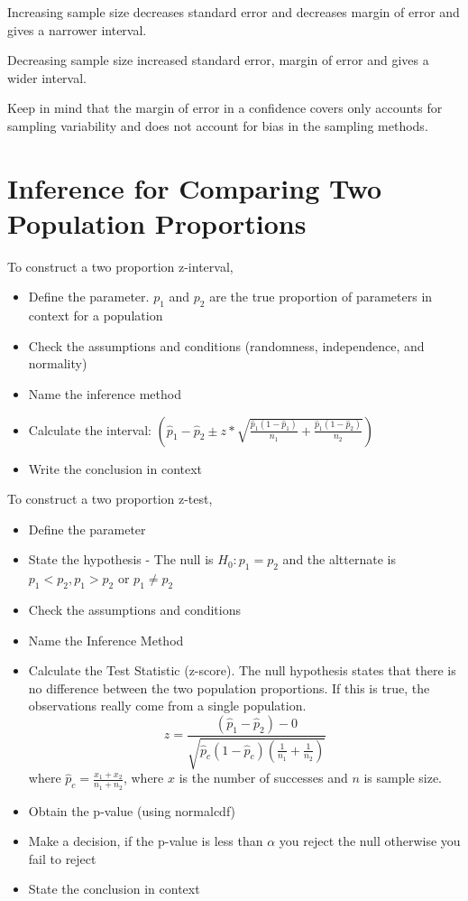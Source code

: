 \documentclass[../stats.tex]{subfiles}
\begin{document}
Increasing sample size decreases standard error and decreases margin of error and gives a narrower interval.

Decreasing sample size increased standard error, margin of error and gives a wider interval.

Keep in mind that the margin of error in a confidence covers only accounts for sampling variability and does not account for bias in the sampling methods.
\section{Inference for Comparing Two Population Proportions}
To construct a two proportion z-interval,
\begin{itemize}
    \item Define the parameter. $p_1$ and $p_2$ are the true proportion of parameters in context for a population 
    \item Check the assumptions and conditions (randomness, independence, and normality)
    \item Name the inference method
    \item Calculate the interval: $(\hat{p}_1-\hat{p}_2\pm z*\sqrt{\frac{\hat{p}_1(1-\hat{p}_1)}{n_1}+\frac{\hat{p}_1(1-\hat{p}_2)}{n_2}})$
    \item Write the conclusion in context 
\end{itemize}

To construct a two proportion z-test,
\begin{itemize}
    \item Define the parameter
    \item State the hypothesis - The null is $H_0: p_1=p_2$ and the altternate is $p_1<p_2,p_1>p_2$ or $p_1\neq p_2$
    \item Check the assumptions and conditions 
    \item Name the Inference Method 
    \item Calculate the Test Statistic (z-score). The null hypothesis states that there is no difference between the two population proportions. If this is true, the observations really come from a single population.
    \[ z = \frac{(\hat{p}_1-\hat{p}_2)-0}{\sqrt{\hat{p}_c(1-\hat{p}_c)\left(\frac{1}{n_1}+\frac{1}{n_2}\right)}} \]
    where $\hat{p}_c = \frac{x_1+x_2}{n_1+n_2}$, where $x$ is the number of successes and $n$ is sample size.
    \item Obtain the p-value (using normalcdf)
    \item Make a decision, if the p-value is less than $\alpha$ you reject the null otherwise you fail to reject 
    \item State the conclusion in context 
\end{itemize}
\end{document}
